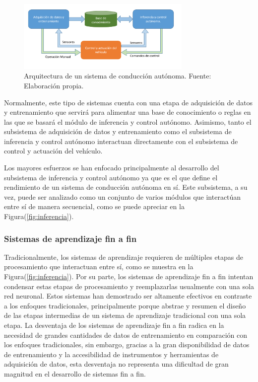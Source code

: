
\begin{figure}[!h] 
    \centering
    \includegraphics[width=0.75\textwidth]{img/esquema}
    \caption[Arquitectura de un sistema de conducción autónoma]{Arquitectura de un sistema de conducción autónoma. Fuente: Elaboración propia.}
    \label{fig:esquema}
\end{figure}


Normalmente, este tipo de sistemas cuenta con una etapa de adquisición de datos y entrenamiento que servirá para 
alimentar una base de conocimiento o reglas en las que se basará el módulo de inferencia y control autónomo. 
Asimismo, tanto el subsistema de adquisición de datos y entrenamiento como el subsistema de inferencia y 
control autónomo interactuan directamente con el subsistema de control y actuación del vehículo. 

Los mayores esfuerzos se han enfocado principalmente al desarrollo del subsistema de inferencia y 
control autónomo ya que es el que define el rendimiento de un sistema de conducción autónoma en sí. 
Este subsistema, a su vez, puede ser analizado como un conjunto de varios módulos que interactúan 
entre sí de manera secuencial, como se puede apreciar en la Figura(\ref{fig:inferencia}). 

\subsubsection{Sistemas de aprendizaje fin a fin}
Tradicionalmente, los sistemas de aprendizaje requieren de múltiples etapas de procesamiento que interactuan entre sí, como se 
muestra en la Figura(\ref{fig:inferencia}). Por su parte, los sistemas de aprendizaje fin a fin intentan condensar 
estas etapas de procesamiento y reemplazarlas usualmente con una sola red neuronal. Estos sistemas han demostrado ser 
altamente efectivos en contraste a los enfoques tradicionales, principalmente porque abstrae y resumen el diseño de las 
etapas intermedias de un sistema de aprendizaje tradicional con una sola etapa. La desventaja de los 
sistemas de aprendizaje fin a fin radica en la necesidad de grandes cantidades de datos de entrenamiento 
en comparación con los enfoques tradicionales, sin embargo, gracias a la gran disponibilidad de datos de entrenamiento y 
la accesibilidad de instrumentos y herramientas de adquisición de datos, esta desventaja no representa una dificultad de 
gran magnitud en el desarrollo de sistemas fin a fin. 

